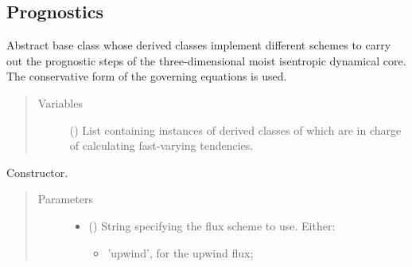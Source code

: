\documentclass[letterpaper,10pt,english]{sphinxmanual}
\begin{document}
\subsection{Prognostics}
\label{\detokenize{api:prognostics}}

\begin{fulllineitems}
\label{\detokenize{api:tasmania.dycore.prognostic_isentropic.PrognosticIsentropic}}
Abstract base class whose derived classes implement different schemes to carry out the prognostic steps of
the three-dimensional moist isentropic dynamical core. The conservative form of the governing equations is used.
\begin{quote}\begin{description}
\item[{Variables}] \leavevmode
{\hyperref[\detokenize{api:tasmania.dycore.dycore.DynamicalCore.fast_tendency_parameterizations}]{}} () \textendash{} List containing instances of derived classes of
{\hyperref[\detokenize{api:tasmania.parameterizations.fast_tendencies.FastTendency}]{}} which are in charge of
calculating fast-varying tendencies.

\end{description}\end{quote}

\begin{fulllineitems}
\label{\detokenize{api:tasmania.dycore.prognostic_isentropic.PrognosticIsentropic.__init__}}
Constructor.
\begin{quote}\begin{description}
\item[{Parameters}] \leavevmode\begin{itemize}
\item {} 
 () \textendash{} 
String specifying the flux scheme to use. Either:
\begin{itemize}
\item {} 
’upwind’, for the upwind flux;


\end{itemize}
\end{itemize}
\end{description}
\end{quote}
\end{fulllineitems}
\end{fulllineitems}
\end{document}
